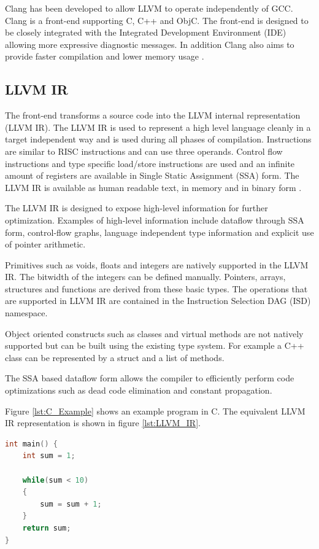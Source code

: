 Clang has been developed to allow LLVM to operate independently of GCC. Clang is a front-end supporting C, C++ and ObjC. The front-end is designed to be closely integrated with the Integrated Development Environment (IDE) allowing more expressive diagnostic messages. In addition Clang also aims to provide faster compilation and lower memory usage \cite{clang:features}.

\subsection{LLVM IR}
The front-end transforms a source code into the LLVM internal representation (LLVM IR). The LLVM IR is used to represent a high level language cleanly in a target independent way and is used during all phases of compilation. Instructions are similar to RISC instructions and can use three operands. Control flow instructions and type specific load/store instructions are used and an infinite amount of registers are available in Single Static Assignment (SSA) form. The LLVM IR is available as human readable text, in memory and in binary form \cite{llvm:presentation}.

The LLVM IR is designed to expose high-level information for further optimization. Examples of high-level information include dataflow through SSA form, control-flow graphs, language independent type information and explicit use of pointer arithmetic. 

Primitives such as voids, floats and integers are natively supported in the LLVM IR. The bitwidth of the integers can be defined manually. Pointers, arrays, structures and functions are derived from these basic types. The operations that are supported in LLVM IR are contained in the Instruction Selection DAG (ISD) namespace.

Object oriented constructs such as classes and virtual methods are not natively supported but can be built using the existing type system. For example a C++ class can be represented by a struct and a list of methods. 

The SSA based dataflow form allows the compiler to efficiently perform code optimizations such as dead code elimination and constant propagation. 

Figure \ref{lst:C_Example} shows an example program in C. The equivalent LLVM IR representation is shown in figure \ref{lst:LLVM_IR}.

\lstset{numbers=none, captionpos=b}
\begin{lstlisting}[language=C,caption={C example program},label=lst:C_Example]
int main() {
	int sum = 1;

	while(sum < 10)
	{
		sum = sum + 1;
	}
	return sum;
}
\end{lstlisting}


